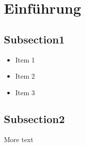 \documentclass[
    ngerman,
    accentcolor=3b,
    fontsize= 12pt,
    a4paper,
    aspectratio=169,
    colorback=true,
    fancy_row_colors,
    leqno,
    fleqn,
    boxarc=3pt,
    fleqn,
    main,
    design=2008,
]{algoslides}
\begin{document}
    \section{Einführung}\label{1}\label{Einfuehrung}
    \subsection{Subsection1}
    \begin{frame}[<+(1)->]
        \slidehead{}
        \begin{itemize}
            \item Item 1
            \item Item 2
            \item Item 3
        \end{itemize}
    \end{frame}

    \subsection{Subsection2}
    \begin{frame}
        \slidehead{}
        More text
    \end{frame}
\end{document}
